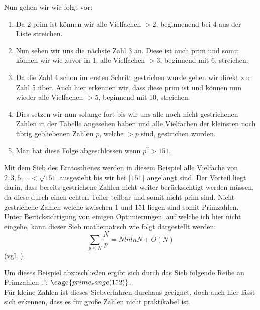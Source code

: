 \documentclass[german,12pt,a4paper]{article}
\begin{document}
Nun gehen wir wie folgt vor:
\begin{enumerate}
    \item Da 2 prim ist können wir alle Vielfachen $>2$, beginnenend bei 4 aus der Liste streichen.
    \item Nun sehen wir uns die nächste Zahl 3 an.
    Diese ist auch prim und somit können wir wie zuvor in 1. alle Vielfachen $>3$, beginnend mit 6, streichen.
    \item Da die Zahl 4 schon im ersten Schritt gestrichen wurde gehen wir direkt zur Zahl 5 über.
    Auch hier erkennen wir, dass diese prim ist und können nun wieder alle Vielfachen $>5$, beginnend mit 10, streichen.
    \item Dies setzen wir nun solange fort bis wir uns alle noch nicht gestrichenen Zahlen in der Tabelle angesehen haben und alle Vielfachen der kleinsten noch übrig gebliebenen Zahlen $p$, welche $>p$ sind, gestrichen wurden.
    \item Man hat diese Folge abgeschlossen wenn $p^2 > 151$. 
\end{enumerate}
Mit dem Sieb des Eratosthenes werden in diesem Beispiel alle Vielfache von $2, 3, 5, ... < \sqrt{151}$ ausgesiebt bis wir bei $\lceil151\rceil$ angelangt sind.
Der Vorteil liegt darin, dass bereits gestrichene Zahlen nicht weiter berücksichtigt werden müssen, da diese durch einen echten Teiler teilbar und somit nicht prim sind.
Nicht gestrichene Zahlen welche zwischen 1 und 151 liegen sind somit Primzahlen.
Unter Berücksichtigung von einigen Optimierungen, auf welche ich hier nicht eingehe, kann dieser Sieb mathematisch wie folgt dargestellt werden:
\[\sum_{p\le N} \frac{N}p = N ln ln N + O(N)\]
(vgl. \cite[121]{Crandall2005}).

Um dieses Beispiel abzuschließen ergibt sich durch das Sieb folgende Reihe an Primzahlen $\mathbb{P}$: $\sage{prime_range(152)}$.\\
Für kleine Zahlen ist dieses Siebverfahren durchaus geeignet, doch auch hier lässt sich erkennen, dass es für große Zahlen nicht praktikabel ist.
\end{document}
